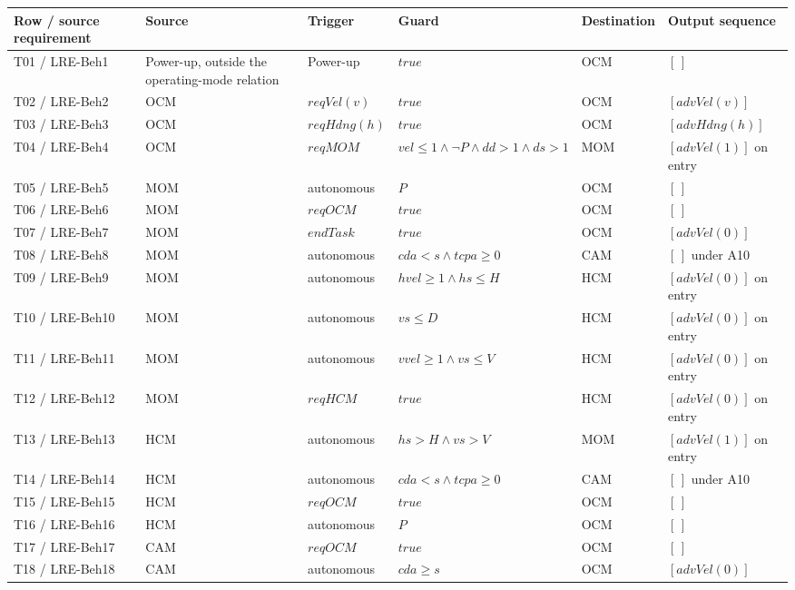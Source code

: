 \documentclass[10pt,a4paper]{article}
\begin{document}
\begin{longtable}{@{}L{0.14\textwidth}L{0.09\textwidth}L{0.11\textwidth}L{0.26\textwidth}L{0.10\textwidth}L{0.17\textwidth}@{}}
\toprule
\textbf{Row / source requirement} & \textbf{Source} & \textbf{Trigger} & \textbf{Guard} & \textbf{Destination} & \textbf{Output sequence} \\
\midrule
\endhead

T01 / LRE-Beh1 & Power-up, outside the operating-mode relation & Power-up & $\mathit{true}$ & OCM & $[\,]$ \\
T02 / LRE-Beh2 & OCM & $\mathit{reqVel}(\mathit{v})$ & $\mathit{true}$ & OCM & $[\mathit{advVel}(\mathit{v})]$ \\
T03 / LRE-Beh3 & OCM & $\mathit{reqHdng}(\mathit{h})$ & $\mathit{true}$ & OCM & $[\mathit{advHdng}(\mathit{h})]$ \\
T04 / LRE-Beh4 & OCM & $\mathit{reqMOM}$ & $\mathit{vel} \le  1 \land  \lnot \mathit{P} \land  \mathit{dd} > 1 \land  \mathit{ds} > 1$ & MOM & $[\mathit{advVel}(1)]$ on entry \\
T05 / LRE-Beh5 & MOM & autonomous & $\mathit{P}$ & OCM & $[\,]$ \\
T06 / LRE-Beh6 & MOM & $\mathit{reqOCM}$ & $\mathit{true}$ & OCM & $[\,]$ \\
T07 / LRE-Beh7 & MOM & $\mathit{endTask}$ & $\mathit{true}$ & OCM & $[\mathit{advVel}(0)]$ \\
T08 / LRE-Beh8 & MOM & autonomous & $\mathit{cda} < \mathit{s} \land  \mathit{tcpa} \ge  0$ & CAM & $[\,]$ under A10 \\
T09 / LRE-Beh9 & MOM & autonomous & $\mathit{hvel} \ge  1 \land  \mathit{hs} \le  \mathit{H}$ & HCM & $[\mathit{advVel}(0)]$ on entry \\
T10 / LRE-Beh10 & MOM & autonomous & $\mathit{vs} \le  \mathit{D}$ & HCM & $[\mathit{advVel}(0)]$ on entry \\
T11 / LRE-Beh11 & MOM & autonomous & $\mathit{vvel} \ge  1 \land  \mathit{vs} \le  \mathit{V}$ & HCM & $[\mathit{advVel}(0)]$ on entry \\
T12 / LRE-Beh12 & MOM & $\mathit{reqHCM}$ & $\mathit{true}$ & HCM & $[\mathit{advVel}(0)]$ on entry \\
T13 / LRE-Beh13 & HCM & autonomous & $\mathit{hs} > \mathit{H} \land  \mathit{vs} > \mathit{V}$ & MOM & $[\mathit{advVel}(1)]$ on entry \\
T14 / LRE-Beh14 & HCM & autonomous & $\mathit{cda} < \mathit{s} \land  \mathit{tcpa} \ge  0$ & CAM & $[\,]$ under A10 \\
T15 / LRE-Beh15 & HCM & $\mathit{reqOCM}$ & $\mathit{true}$ & OCM & $[\,]$ \\
T16 / LRE-Beh16 & HCM & autonomous & $\mathit{P}$ & OCM & $[\,]$ \\
T17 / LRE-Beh17 & CAM & $\mathit{reqOCM}$ & $\mathit{true}$ & OCM & $[\,]$ \\
T18 / LRE-Beh18 & CAM & autonomous & $\mathit{cda} \ge  \mathit{s}$ & OCM & $[\mathit{advVel}(0)]$ \\
\bottomrule
\end{longtable}
\end{document}
